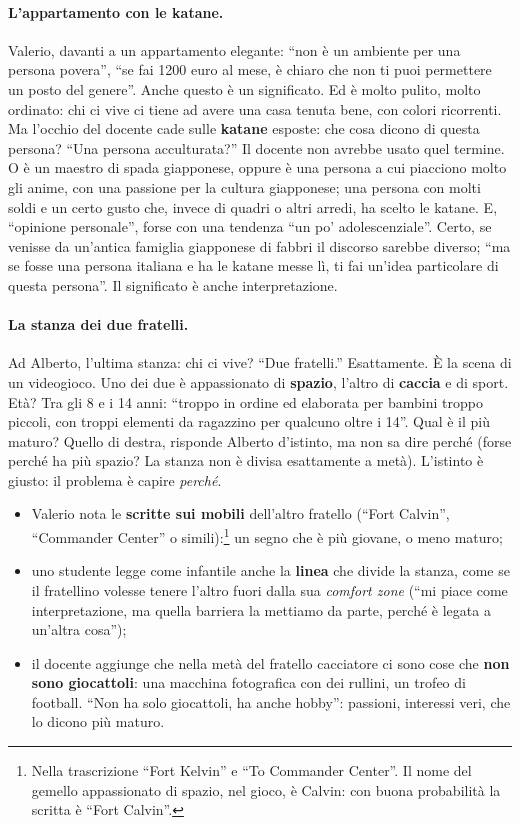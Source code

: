 \paragraph{L'appartamento con le katane.} Valerio, davanti a un appartamento elegante:
``non è un ambiente per una persona povera'', ``se fai 1200 euro al mese, è chiaro che non
ti puoi permettere un posto del genere''. Anche questo è un significato. Ed è molto
pulito, molto ordinato: chi ci vive ci tiene ad avere una casa tenuta bene, con colori
ricorrenti. Ma l'occhio del docente cade sulle \textbf{katane} esposte: che cosa dicono di
questa persona? ``Una persona acculturata?'' Il docente non avrebbe usato quel termine.
O è un maestro di spada giapponese, oppure è una persona a cui piacciono molto gli anime,
con una passione per la cultura giapponese; una persona con molti soldi e un certo gusto
che, invece di quadri o altri arredi, ha scelto le katane. E, ``opinione personale'', forse
con una tendenza ``un po' adolescenziale''. Certo, se venisse da un'antica famiglia
giapponese di fabbri il discorso sarebbe diverso; ``ma se fosse una persona italiana e ha
le katane messe lì, ti fai un'idea particolare di questa persona''. Il significato è
anche interpretazione.

\paragraph{La stanza dei due fratelli.} Ad Alberto, l'ultima stanza: chi ci vive? ``Due
fratelli.'' Esattamente. È la scena di un videogioco. Uno dei due è appassionato di
\textbf{spazio}, l'altro di \textbf{caccia} e di sport. Età? Tra gli 8 e i 14 anni:
``troppo in ordine ed elaborata per bambini troppo piccoli, con troppi elementi da
ragazzino per qualcuno oltre i 14''. Qual è il più maturo? Quello di destra, risponde
Alberto d'istinto, ma non sa dire perché (forse perché ha più spazio? La stanza non è
divisa esattamente a metà). L'istinto è giusto: il problema è capire \emph{perché}.
\begin{itemize}
  \item Valerio nota le \textbf{scritte sui mobili} dell'altro fratello (``Fort Calvin'',
        ``Commander Center'' o simili):\footnote{Nella trascrizione ``Fort Kelvin'' e ``To
        Commander Center''. Il nome del gemello appassionato di spazio, nel gioco, è
        Calvin: con buona probabilità la scritta è ``Fort Calvin''.} un segno che è più
        giovane, o meno maturo;
  \item uno studente legge come infantile anche la \textbf{linea} che divide la stanza,
        come se il fratellino volesse tenere l'altro fuori dalla sua \emph{comfort zone}
        (``mi piace come interpretazione, ma quella barriera la mettiamo da parte, perché è
        legata a un'altra cosa'');
  \item il docente aggiunge che nella metà del fratello cacciatore ci sono cose che
        \textbf{non sono giocattoli}: una macchina fotografica con dei rullini, un trofeo
        di football. ``Non ha solo giocattoli, ha anche hobby'': passioni, interessi veri,
        che lo dicono più maturo.
\end{itemize}

